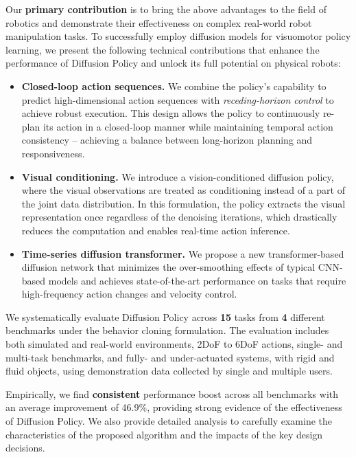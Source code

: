 Our \textbf{primary contribution} is to bring the above advantages to the field of robotics and demonstrate their effectiveness on complex real-world robot manipulation tasks. To successfully employ diffusion models for visuomotor policy learning, we present the following technical contributions that enhance the performance of Diffusion Policy and unlock its full potential on physical robots:
\begin{itemize} 
    \item \textbf{Closed-loop action sequences.} We combine the policy's capability to predict high-dimensional action sequences with \textit{receding-horizon control} to achieve robust execution. This design allows the policy to continuously re-plan its action in a closed-loop manner while maintaining temporal action consistency -- achieving a balance between long-horizon planning and responsiveness. 

    

    \item \textbf{Visual conditioning.} We introduce a vision-conditioned diffusion policy, where the visual observations are treated as conditioning instead of a part of the joint data distribution.  In this formulation, the policy extracts the visual representation once regardless of the denoising iterations, which drastically reduces the computation and enables real-time action inference. 


    \item \textbf{Time-series diffusion transformer.} We propose a new transformer-based diffusion network  that minimizes the over-smoothing effects of typical CNN-based models and achieves state-of-the-art performance on tasks that require high-frequency action changes and velocity control. 
\end{itemize}

We systematically evaluate Diffusion Policy across \textbf{15} tasks from \textbf{4} different benchmarks \cite{ibc, gupta2019relay, robomimic, bet} under the behavior cloning formulation. The evaluation includes both simulated and real-world environments, 2DoF to 6DoF actions, single- and multi-task benchmarks, and fully- and under-actuated systems, with rigid and fluid objects, using demonstration data collected by single and multiple users.  

Empirically, we find \textbf{consistent} performance boost across all benchmarks with an average improvement of 46.9\%, providing strong evidence of the effectiveness of Diffusion Policy. We also provide detailed analysis to carefully examine the characteristics of the proposed algorithm and the impacts of the key design decisions. 

